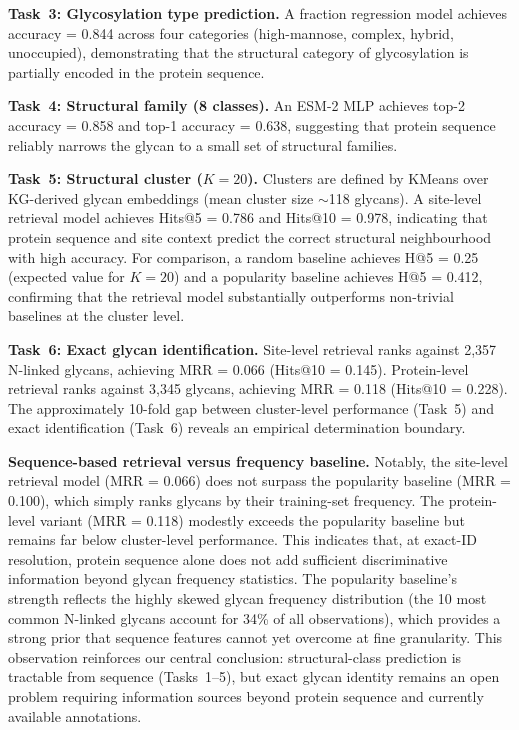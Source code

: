 \documentclass[11pt,a4paper]{article}
\begin{document}
\textbf{Task~3: Glycosylation type prediction.} A fraction regression model
achieves accuracy = 0.844 across four categories (high-mannose, complex, hybrid,
unoccupied), demonstrating that the structural category of glycosylation is
partially encoded in the protein sequence.

\textbf{Task~4: Structural family (8 classes).} An ESM-2 MLP achieves top-2
accuracy = 0.858 and top-1 accuracy = 0.638, suggesting that protein sequence
reliably narrows the glycan to a small set of structural families.

\textbf{Task~5: Structural cluster ($K = 20$).} Clusters are defined by KMeans
over KG-derived glycan embeddings (mean cluster size $\sim$118 glycans). A
site-level retrieval model achieves Hits@5 = 0.786 and Hits@10 = 0.978,
indicating that protein sequence and site context predict the correct structural
neighbourhood with high accuracy. For comparison, a random baseline achieves H@5 = 0.25 (expected value for $K = 20$) and a popularity baseline achieves H@5 = 0.412, confirming that the retrieval model substantially outperforms non-trivial baselines at the cluster level.

\textbf{Task~6: Exact glycan identification.} Site-level retrieval ranks against
2,357 N-linked glycans, achieving MRR = 0.066 (Hits@10 = 0.145). Protein-level
retrieval ranks against 3,345 glycans, achieving MRR = 0.118 (Hits@10 = 0.228).
The approximately 10-fold gap between cluster-level performance (Task~5) and
exact identification (Task~6) reveals an empirical determination boundary.

\textbf{Sequence-based retrieval versus frequency baseline.} Notably, the
site-level retrieval model (MRR = 0.066) does not surpass the popularity
baseline (MRR = 0.100), which simply ranks glycans by their training-set
frequency. The protein-level variant (MRR = 0.118) modestly exceeds the
popularity baseline but remains far below cluster-level performance.
This indicates that, at exact-ID resolution, protein sequence alone does
not add sufficient discriminative information beyond glycan frequency
statistics. The popularity baseline's strength reflects the highly skewed
glycan frequency distribution (the 10 most common N-linked glycans account
for 34\% of all observations), which provides a strong prior that
sequence features cannot yet overcome at fine granularity.  This
observation reinforces our central conclusion: structural-class prediction
is tractable from sequence (Tasks~1--5), but exact glycan identity remains
an open problem requiring information sources beyond protein sequence
and currently available annotations.
\end{document}
